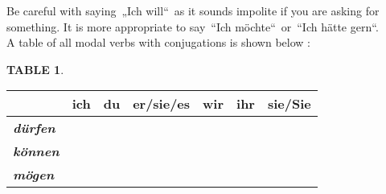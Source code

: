 \documentclass[a4paper,twocolumn,10pt]{article}
\newtheorem{mytable}{TABLE}[section]
\begin{document}

Be careful with saying „Ich will“ as it sounds impolite if you are asking for
something. It is more appropriate to say “Ich möchte“ or “Ich hätte
gern“.\\

A table of all modal verbs with conjugations is shown below :





\nolinenumbers

\begin{table-bg}[width=\textwidth]{}

\label{table:modal_verbs}

	\begin{table-title}[width=6.5cm]{}
		\captionsetup{labelformat=empty}
	\end{table-title}

	\begin{table-theword}
		\footnotesize \begin{mytable} \end{mytable}
	\end{table-theword}

	\begin{table-content}
	\begin{tabularx}{\textwidth}{X|X|X|X|XXX}
&
\cellcolor{gray-light} \textbf{ich} &
\cellcolor{gray-light} \textbf{du} &
\cellcolor{gray-light} \textbf{er/sie/es} &
\cellcolor{gray-light} \textbf{wir} &
\cellcolor{gray-light} \textbf{ihr} &
\cellcolor{gray-light} \textbf{sie/Sie} \\
\midrule

\cellcolor{gray-light} \textbf{\textit{dürfen}} &
\cellcolor{white}                  &
\cellcolor{white}                  &
\cellcolor{white}                  &
\cellcolor{white}                  &
\cellcolor{white}                  &
\cellcolor{white} \\

\cellcolor{gray-light} \textbf{\textit{können}} &
\cellcolor{white}                  &
\cellcolor{white}                  &
\cellcolor{white}                  &
\cellcolor{white}                  &
\cellcolor{white}                  &
\cellcolor{white} \\

\cellcolor{gray-light} \textbf{\textit{mögen}} &
\cellcolor{white}                  &
\cellcolor{white}                  &
\cellcolor{white}                  &
\cellcolor{white}                  &
\cellcolor{white}                  &
\cellcolor{white} \\


\end{tabularx}
\end{table-content}
\end{table-bg}
\end{document}
